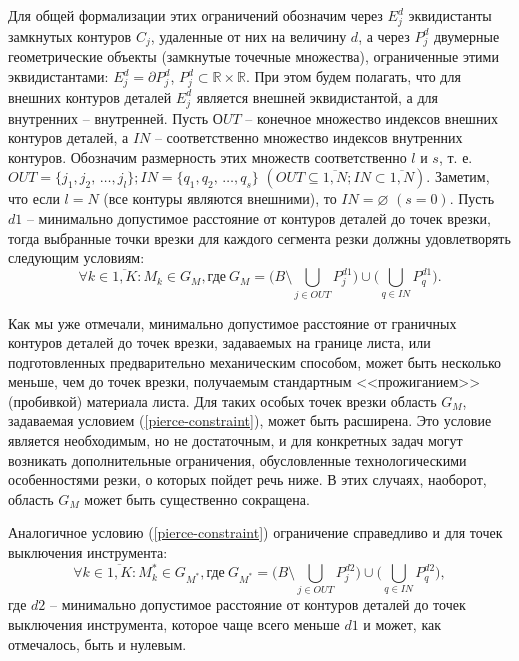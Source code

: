 \documentclass[11pt,twoside,openany]{report}
\begin{document}
Для общей формализации этих ограничений обозначим через
$E_j^d$ эквидистанты замкнутых контуров $C_j$,
удаленные от них на величину $d$,
а через
$P_j^d$ двумерные геометрические объекты
(замкнутые точечные множества),
ограниченные этими эквидистантами:
$E_j^d = \partial P_j^d$,
$P_j^d \subset \mathbb R \times \mathbb R$.
При этом будем полагать,
что для внешних контуров деталей
$E_j^d$
является внешней эквидистантой,
а для внутренних -- внутренней.
Пусть $ОUT$ -- конечное множество индексов внешних контуров деталей,
а $IN$ -- соответственно множество индексов внутренних контуров.
Обозначим  размерность этих множеств соответственно $l$ и $s$,
т. е.
$OUT = \{j_1, j_2, \,\dots, j_l\};
IN = \{q_1, q_2, \,\dots, q_s\}$
$(OUT \subseteq \overline{1,N};
IN \subset \overline{1,N})$.
Заметим, что если $l=N$
(все контуры являются внешними), то
$IN = \varnothing$
$(s = 0)$.
Пусть $d1$ -- минимально допустимое расстояние от контуров деталей до точек врезки,
тогда выбранные точки врезки для каждого сегмента резки должны удовлетворять следующим условиям:
\begin{equation}
  \forall k \in \overline{1,K}:
  M_k \in G_M,
  \text{где}\:
  G_M = \big(B \setminus \bigcup_{j\in OUT} P_j^{d1} \big)
  \cup
  \big( \bigcup_{q\in IN}P_q^{d1} \big)
  .
  \label{pierce-constraint}
\end{equation}

Как мы уже отмечали,
минимально допустимое расстояние от граничных контуров деталей
до точек врезки,
задаваемых на границе листа,
или подготовленных предварительно механическим способом,
может быть несколько меньше,
чем до точек врезки, получаемым стандартным <<прожиганием>> (пробивкой) материала листа.
Для таких особых точек врезки область $G_M$,
задаваемая условием (\ref{pierce-constraint}),
может быть расширена.
Это условие является необходимым, но не достаточным,
и для конкретных задач могут возникать дополнительные ограничения,
обусловленные технологическими особенностями резки,
о которых пойдет речь ниже.
В этих случаях, наоборот, область $G_M$
может быть существенно сокращена.

Аналогичное условию (\ref{pierce-constraint})
ограничение справедливо и для точек выключения инструмента:
\begin{equation}
  \forall k \in \overline{1,K}:
  M_k^* \in G_{M^*},
  \text{где}\:
  G_{M^*} = \big(B \setminus \bigcup_{j\in OUT} P_j^{d2} \big)
	\cup
  \big( \bigcup_{q\in IN}P_q^{d2} \big)
  ,
  \label{tool-off-constraint}
\end{equation}
где $d2$ -- минимально допустимое расстояние
от контуров деталей до точек выключения инструмента,
которое чаще всего меньше $d1$
и может, как отмечалось, быть и нулевым.
\end{document}
